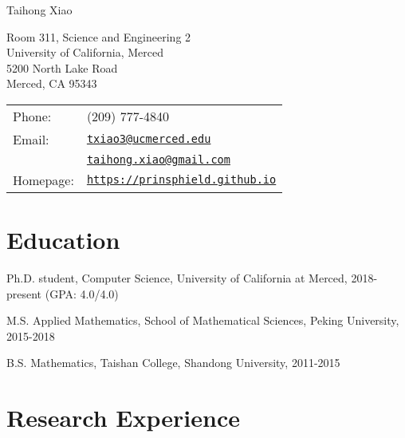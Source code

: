 \documentclass[letterpaper]{article}
\def\name{Taihong Xiao}
\renewenvironment{itemize}{
  \begin{list}{}{
    \setlength{\leftmargin}{1.5em}
  }
}{
  \end{list}
}
\begin{document}
{\huge \name}


\vspace{0.25in}

\begin{minipage}{0.45\linewidth}
	Room 311, Science and Engineering 2\\
	University of California, Merced\\
	5200 North Lake Road\\
	Merced, CA 95343
\end{minipage}
\begin{minipage}{0.45\linewidth}
  \begin{tabular}{ll}
    Phone:  & (209) 777-4840 \\
    Email:  & \href{mailto:txiao3@ucmerced.edu}{\tt txiao3@ucmerced.edu} \\
    		& \href{mailto:taihong.xiao@gmail.com}{\tt taihong.xiao@gmail.com}\\
    Homepage: & \href{https://prinsphield.github.io}{\tt https://prinsphield.github.io} \\
  \end{tabular}
\end{minipage}


\section*{Education}

\begin{itemize}

  \item Ph.D. student, Computer Science, University of California at Merced, 2018-present (GPA: 4.0/4.0)

  \item M.S. Applied Mathematics, School of Mathematical Sciences, Peking University, 2015-2018

  \item B.S. Mathematics, Taishan College, Shandong University, 2011-2015

\end{itemize}



\section*{Research Experience}
\end{document}

